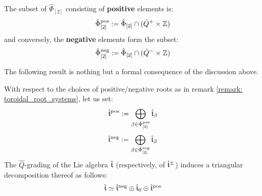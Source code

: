         \begin{definition} \label{def: positive/negative_toroidal_roots}
            The subset of $\hat{\Phi}_{[2]}$ consisting of \textbf{positive} elements is:
                $$\hat{\Phi}_{[2]}^{\positive} := \hat{\Phi}_{[2]} \cap (\hat{Q}^+ \x \Z)$$
            and conversely, the \textbf{negative} elements form the subset:
                $$\hat{\Phi}_{[2]}^{\negative} := \hat{\Phi}_{[2]} \cap (\hat{Q}^- \x \Z)$$
        \end{definition}
        
        The following result is nothing but a formal consequence of the discussion above.
        \begin{proposition} \label{prop: triangular_decomposition_of_extended_toroidal_lie_algebras}
            With respect to the choices of positive/negative roots as in remark \ref{remark: toroidal_root_systems}, let us set:
                $$\hat{\mathfrak{t}}^{\mathrm{pos}} := \bigoplus_{\beta \in \hat{\Phi}_{[2]}^{\mathrm{pos}}} \hat{\mathfrak{t}}_{\beta}$$
                $$\hat{\mathfrak{t}}^{\mathrm{neg}} := \bigoplus_{\beta \in \hat{\Phi}_{[2]}^{\mathrm{neg}}} \hat{\mathfrak{t}}_{\beta}$$
            The $\hat{Q}$-grading of the Lie algebra $\hat{\mathfrak{t}}$ (respectively, of $\hat{\mathfrak{t}}^{\pm}$) induces a triangular decomposition thereof as follows:
                $$\hat{\mathfrak{t}} \simeq \hat{\mathfrak{t}}^{\mathrm{neg}} \oplus \hat{\mathfrak{t}}_0 \oplus \hat{\mathfrak{t}}^{\mathrm{pos}}$$
        \end{proposition}